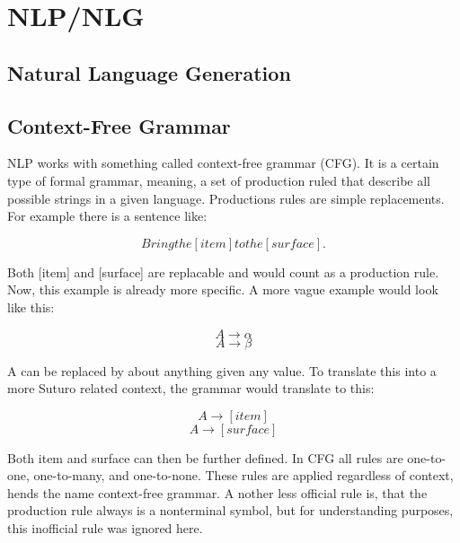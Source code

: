 \documentclass[main.tex]{subfiles}
\begin{document}
	

	\chapter{NLP/NLG}
  
  \section{Natural Language Generation}
  
  
  \section{Context-Free Grammar}
  NLP works with something called context-free grammar (CFG). It is a certain type of formal grammar, meaning, a set of  production ruled that describe all possible strings in a given language. Productions rules are simple replacements. For example there is a sentence like:

\begin{equation}
Bring the [item] to the [surface].
\end{equation}

Both [item] and [surface] are replacable and would count as a production rule. Now, this example is already more specific. A more vague example would look like this:

\begin{equation}
A \rightarrow \alpha
\end{equation}
\begin{equation}
A \rightarrow \beta
\end{equation}

A can be replaced by about anything given any value. To translate this into a more Suturo related context, the grammar would translate to this:

\begin{equation}
A \rightarrow [item] 
\end{equation}
\begin{equation}
A \rightarrow [surface]
\end{equation}

Both item and surface can then be further defined. In CFG all rules are one-to-one, one-to-many, and one-to-none. These rules are applied regardless of context, hends the name context-free grammar. A nother less official rule is, that the production rule always is a nonterminal symbol, but for understanding purposes, this inofficial rule was ignored here.
\end{document}
